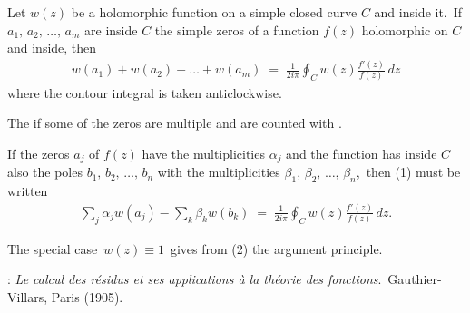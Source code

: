 \documentclass[12pt]{article}
\theoremstyle{definition}
\begin{document}
Let $w(z)$ be a holomorphic function on a simple closed curve $C$ and inside it.\, If $a_1,\,a_2,\,\ldots,\,a_m$ are inside $C$ the simple zeros of a function $f(z)$ holomorphic on $C$ and inside, then
\begin{align}
w(a_1)\!+\!w(a_2)\!+\ldots+\!w(a_m) \;=\; \frac{1}{2i\pi}\!\oint_C\!w(z)\frac{f'(z)}{f(z)}\,dz
\end{align}
where the contour integral is taken anticlockwise.

The  if some of the zeros are multiple and are counted with .

If the zeros $a_j$ of $f(z)$ have the multiplicities $\alpha_j$ and the function has inside $C$ also the poles 
$b_1,\,b_2,\,\ldots,\,b_n$ with the multiplicities $\beta_1,\,\beta_2,\,\ldots,\,\beta_n$,\, then (1) must be written
\begin{align}
\sum_j\alpha_jw(a_j)-\sum_k\beta_kw(b_k) \;=\; \frac{1}{2i\pi}\!\oint_C\!w(z)\frac{f'(z)}{f(z)}\,dz.
\end{align}


The special case \,$w(z) \equiv 1$\, gives from (2) the argument principle.

\begin{thebibliography}{8}
: {\em Le calcul des r\'esidus et ses applications \`a la th\'eorie des fonctions}.\, Gauthier-Villars, Paris (1905).
\end{thebibliography}
\end{document}
